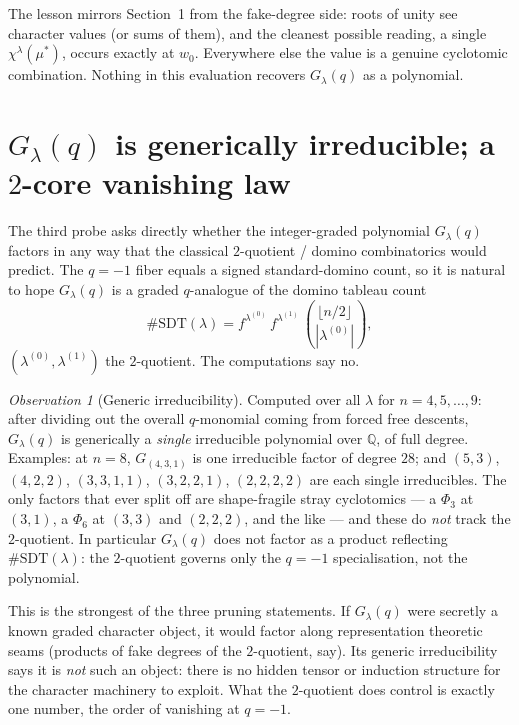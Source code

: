 \documentclass{article}
\theoremstyle{definition}
\theoremstyle{remark}
\newtheorem{observation}{Observation}
\newcommand{\Q}{\mathbb{Q}}
\begin{document}
The lesson mirrors Section~1 from the fake-degree side: roots of unity see
character values (or sums of them), and the cleanest possible reading, a single
$\chi^\lambda(\mu^*)$, occurs exactly at $w_0$. Everywhere else the value is a
genuine cyclotomic combination. Nothing in this evaluation recovers
$G_\lambda(q)$ as a polynomial.

\section{$G_\lambda(q)$ is generically irreducible; a $2$-core vanishing law}

The third probe asks directly whether the integer-graded polynomial
$G_\lambda(q)$ factors in any way that the classical $2$-quotient / domino
combinatorics would predict. The $q=-1$ fiber equals a signed standard-domino
count, so it is natural to hope $G_\lambda(q)$ is a graded $q$-analogue of the
domino tableau count
\[
\#\mathrm{SDT}(\lambda) = f^{\lambda^{(0)}}\, f^{\lambda^{(1)}}\,
\binom{\lfloor n/2\rfloor}{|\lambda^{(0)}|},
\]
$(\lambda^{(0)},\lambda^{(1)})$ the $2$-quotient. The computations say no.

\begin{observation}[Generic irreducibility]\label{obs:irred}
Computed over all $\lambda$ for $n = 4,5,\dots,9$: after dividing out the overall
$q$-monomial coming from forced free descents, $G_\lambda(q)$ is generically a
\emph{single} irreducible polynomial over $\Q$, of full degree. Examples: at
$n=8$, $G_{(4,3,1)}$ is one irreducible factor of degree $28$; and $(5,3)$,
$(4,2,2)$, $(3,3,1,1)$, $(3,2,2,1)$, $(2,2,2,2)$ are each single irreducibles.
The only factors that ever split off are shape-fragile stray cyclotomics --- a
$\Phi_3$ at $(3,1)$, a $\Phi_6$ at $(3,3)$ and $(2,2,2)$, and the like --- and
these do \emph{not} track the $2$-quotient. In particular $G_\lambda(q)$ does not
factor as a product reflecting $\#\mathrm{SDT}(\lambda)$: the $2$-quotient governs
only the $q=-1$ specialisation, not the polynomial.
\end{observation}

This is the strongest of the three pruning statements. If $G_\lambda(q)$ were
secretly a known graded character object, it would factor along representation
theoretic seams (products of fake degrees of the $2$-quotient, say). Its generic
irreducibility says it is \emph{not} such an object: there is no hidden tensor or
induction structure for the character machinery to exploit. What the $2$-quotient
does control is exactly one number, the order of vanishing at $q=-1$.
\end{document}
